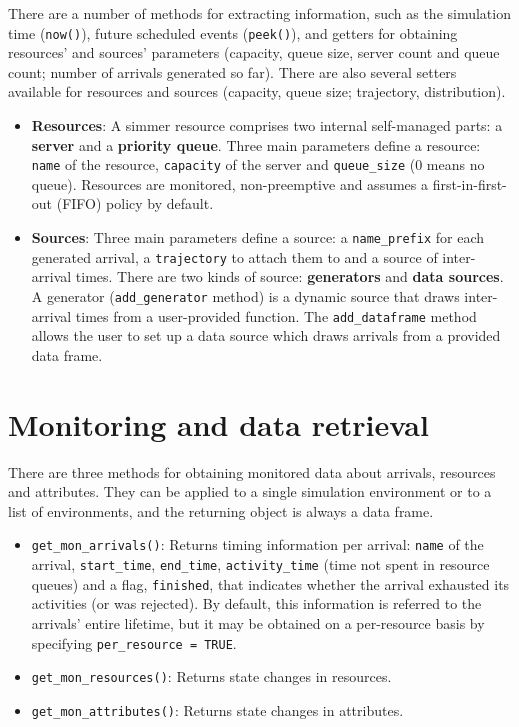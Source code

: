 \documentclass[
]{book}
\providecommand{\tightlist}{%
  \setlength{\itemsep}{0pt}\setlength{\parskip}{0pt}}
\theoremstyle{definition}
\theoremstyle{definition}
\theoremstyle{definition}
\theoremstyle{definition}
\theoremstyle{remark}
\begin{document}
There are a number of methods for extracting information, such as the simulation time (\texttt{now()}), future scheduled events (\texttt{peek()}), and getters for obtaining resources' and sources' parameters (capacity, queue size, server count and queue count; number of arrivals generated so far). There are also several setters available for resources and sources (capacity, queue size; trajectory, distribution).

\begin{itemize}
\item
  \textbf{Resources}: A simmer resource comprises two internal self-managed parts: a \textbf{server} and a \textbf{priority queue}. Three main parameters define a resource: \texttt{name} of the resource, \texttt{capacity} of the server and \texttt{queue\_size} (0 means no queue). Resources are monitored, non-preemptive and assumes a first-in-first-out (FIFO) policy by default.
\item
  \textbf{Sources}: Three main parameters define a source: a \texttt{name\_prefix} for each generated arrival, a \texttt{trajectory} to attach them to and a source of inter-arrival times. There are two kinds of source: \textbf{generators} and \textbf{data sources}. A generator (\texttt{add\_generator} method) is a dynamic source that draws inter-arrival times from a user-provided function. The \texttt{add\_dataframe} method allows the user to set up a data source which draws arrivals from a provided data frame.
\end{itemize}

\hypertarget{monitoring-and-data-retrieval}{%
\section{Monitoring and data retrieval}\label{monitoring-and-data-retrieval}}

There are three methods for obtaining monitored data about arrivals, resources and attributes. They can be applied to a single simulation environment or to a list of environments, and the returning object is always a data frame.

\begin{itemize}
\tightlist
\item
  \texttt{get\_mon\_arrivals()}: Returns timing information per arrival: \texttt{name} of the arrival, \texttt{start\_time}, \texttt{end\_time}, \texttt{activity\_time} (time not spent in resource queues) and a flag, \texttt{finished}, that indicates whether the arrival exhausted its activities (or was rejected). By default, this information is referred to the arrivals' entire lifetime, but it may be obtained on a per-resource basis by specifying \texttt{per\_resource\ =\ TRUE}.
\item
  \texttt{get\_mon\_resources()}: Returns state changes in resources.
\item
  \texttt{get\_mon\_attributes()}: Returns state changes in attributes.
\end{itemize}
\end{document}
